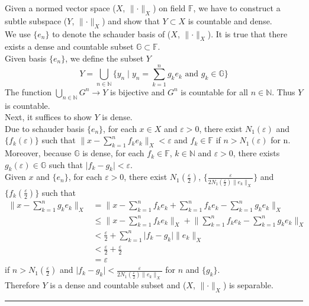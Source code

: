 \documentclass[12pt]{article}
\numberwithin{equation}{section}
\theoremstyle{plain} %
\theoremstyle{definition}
\theoremstyle{remark}
\newenvironment{proof}{{\bf Proof:}}{\hfill\rule{2mm}{2mm}}
\begin{document}
\begin{proof}
Given a normed vector space ($X$, $\lVert \cdot \rVert_{X}$) on field $\mathbb{F}$, we have to construct a subtle subspace ($Y$, $\lVert \cdot \rVert_{X}$) and show that $Y \subset X$  is countable and dense. \\
We use $\{e_n\}$ to denote the schauder basis of ($X$, $\lVert \cdot \rVert_{X}$). 
It is true that there exists a dense and countable subset $\mathbb{G} \subset \mathbb{F}$. \\
Given basis $\{e_n\}$, we define the subset $Y$
$$Y = \bigcup_{n \in \mathbb{N}}\{y_n \mid y_n = \sum_{k=1}^{n} g_k e_k \text{ and } g_k \in \mathbb{G}\}$$
The function $\bigcup_{n \in \mathbb{N}} G^{n} \to Y$ is bijective and $G^{n}$ is countable for all $n \in \mathbb{N}$. Thus $Y$ is countable. \\
Next, it suffices to show $Y$ is dense. \\
Due to schauder basis $\{e_n\}$, for each $x \in X$ and $\varepsilon > 0$, there exist $N_1(\varepsilon)$ and $\{f_k(\varepsilon)\}$ such that $\lVert x - \sum_{k=1}^{n} f_k e_k \rVert_{X} < \varepsilon$ and $f_k \in \mathbb{F}$ if $n > N_1(\varepsilon)$ for n. \\
Moreover, because $\mathbb{G}$ is dense, for each $f_k \in \mathbb{F}$, $k \in \mathbb{N}$ and $\varepsilon > 0$, there exists $g_k(\varepsilon) \in \mathbb{G}$ such that $\lvert f_k - g_k \rvert < \varepsilon$. \\
Given $x$ and $\{e_n\}$, for each $\varepsilon > 0$, there exist $N_1(\frac{\varepsilon}{2})$, $\{\frac{\varepsilon}{2N_1(\frac{\varepsilon}{2})\lVert e_k \rVert_{X}}\}$ and $\{f_k(\frac{\varepsilon}{2})\}$ such that
\begin{equation*}
\begin{split}
\lVert x - \sum_{k=1}^{n} g_k e_k \rVert_{X}
	& = \lVert x - \sum_{k=1}^{n} f_k e_k + \sum_{k=1}^{n} f_k e_k - \sum_{k=1}^{n} g_k e_k \rVert_{X} \\
	& \leqslant \lVert x - \sum_{k=1}^{n} f_k e_k \rVert_{X} + \lVert \sum_{k=1}^{n} f_k e_k - \sum_{k=1}^{n} g_k e_k \rVert_{X}\\
	& < \frac{\varepsilon}{2} + \sum_{k=1}^{n} \lvert f_k - g_k \rvert \lVert e_k \rVert_{X}\\
	& < \frac{\varepsilon}{2} + \frac{\varepsilon}{2}\\
	&= \varepsilon
\end{split}
\end{equation*}
if $n > N_1(\frac{\varepsilon}{2})$ and $\lvert f_k - g_k \rvert < \frac{\varepsilon}{2N_1(\frac{\varepsilon}{2})\lVert e_k \rVert_{X}}$ for $n$ and $\{g_k\}$. \\
Therefore $Y$ is a dense and countable subset and ($X$, $\lVert \cdot \rVert_{X}$) is separable. 
\end{proof}
\end{document}
